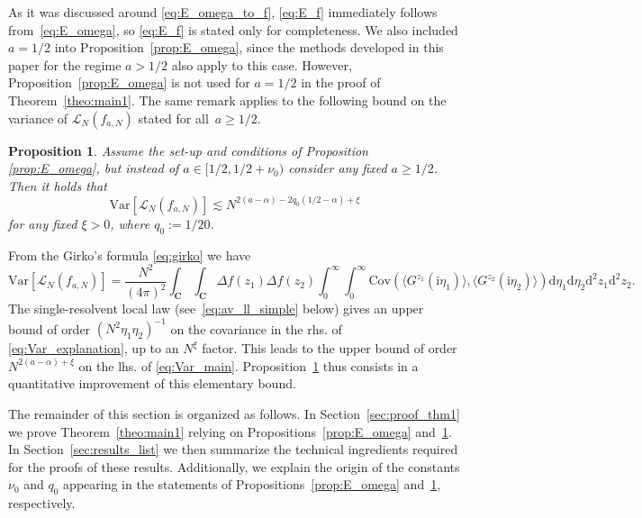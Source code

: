 \documentclass[10pt]{amsart}
\newtheorem{proposition}[theorem]{Proposition}
\numberwithin{equation}{section}
\newcommand{\dif}{\mathrm{d}}
\newcommand{\C}{\mathbf{C}}
\newcommand{\Var}{\mathrm{Var}}
\newcommand{\Lin}{\mathcal{L}}
\newcommand{\ii}{\mathrm{i}}
\begin{document}
As it was discussed around \eqref{eq:E_omega_to_f}, \eqref{eq:E_f} immediately follows from~\eqref{eq:E_omega}, so \eqref{eq:E_f} is stated only for completeness. We also included $a=1/2$ into Proposition~\ref{prop:E_omega}, since the methods developed in this paper for the regime $a>1/2$ also apply to this case. However, Proposition~\ref{prop:E_omega} is not used for $a=1/2$ in the proof of Theorem~\ref{theo:main1}. The same remark applies to the following bound on the variance of $\Lin_N (f_{a,N})$ stated for all~$a\ge 1/2$. 

\begin{proposition}\label{prop:Var_main} Assume the set-up and conditions of Proposition \ref{prop:E_omega}, but instead of $a\in [1/2,1/2+\nu_0)$ consider any fixed $a\ge 1/2$. Then it holds that
\begin{equation}
\Var\left[ \Lin_N(f_{a,N})\right]\lesssim N^{2(a-\alpha) - 2q_0(1/2-\alpha)+\xi} 
\label{eq:Var_main}
\end{equation}
for any fixed $\xi>0$, where $q_0:=1/20$.
\end{proposition}

From the Girko's formula \eqref{eq:girko} we have
\begin{equation}
\Var\left[ \Lin_N(f_{a,N})\right] = \frac{N^2}{(4\pi)^2}\int_\C\int_\C \Delta f(z_1)\Delta f(z_2) \int_0^\infty\int_0^\infty \mathrm{Cov}\left(\langle G^{z_1}(\ii\eta_1)\rangle, \langle G^{z_2}(\ii\eta_2)\rangle\right)\dif\eta_1\dif\eta_2\dif^2 z_1\dif^2 z_2.
\label{eq:Var_explanation}
\end{equation}
The single-resolvent local law (see~\eqref{eq:av_ll_simple} below) gives an upper bound of order $(N^2\eta_1\eta_2)^{-1}$  on the covariance in the rhs. of \eqref{eq:Var_explanation}, up to an $N^\xi$ factor. This leads to the upper bound of order $N^{2(a-\alpha)+\xi}$ on the lhs. of \eqref{eq:Var_main}. Proposition~\ref{prop:Var_main} thus consists in a quantitative improvement of this elementary bound. 


The remainder of this section is organized as follows. In Section~\ref{sec:proof_thm1} we prove Theorem~\ref{theo:main1} relying on Propositions~\ref{prop:E_omega} and~\ref{prop:Var_main}. In Section~\ref{sec:results_list} we then summarize  the technical ingredients required for the proofs of these results. Additionally, we explain the origin of the constants $\nu_0$ and $q_0$ appearing in the statements of Propositions~\ref{prop:E_omega} and~\ref{prop:Var_main}, respectively.
\end{document}
